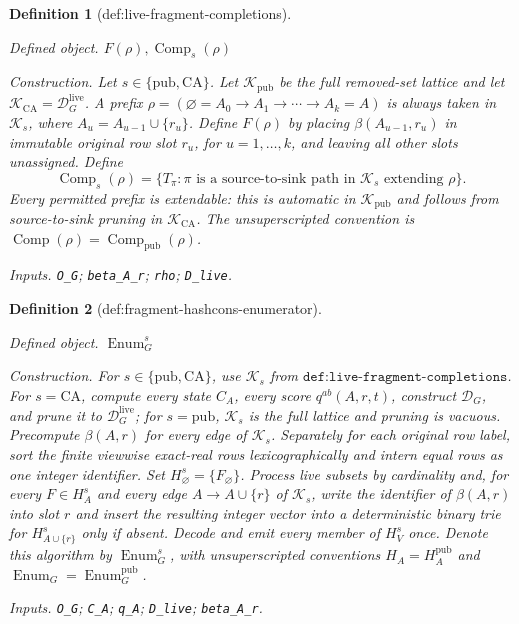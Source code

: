 \documentclass{article}
\newtheorem{definition}{Definition}
\begin{document}
\begin{definition}[def:live-fragment-completions]\label{def:live-fragment-completions}
\par\smallskip\noindent\emph{Defined object.} \(F(\rho),\operatorname{Comp}_s(\rho)\)
\par\smallskip\noindent\emph{Construction.} Let \(s\in\{\mathrm{pub},\mathrm{CA}\}\).  Let \(\mathcal K_{\mathrm{pub}}\) be the full removed-set lattice and let \(\mathcal K_{\mathrm{CA}}=\mathcal D_G^{\mathrm{live}}\).  A prefix \(\rho=(\varnothing=A_0\to A_1\to\cdots\to A_k=A)\) is always taken in \(\mathcal K_s\), where \(A_u=A_{u-1}\cup\{r_u\}\).  Define \(F(\rho)\) by placing \(\beta(A_{u-1},r_u)\) in immutable original row slot \(r_u\), for \(u=1,\ldots,k\), and leaving all other slots unassigned.  Define
\[
 \operatorname{Comp}_s(\rho)=
 \{T_\pi:\pi\text{ is a source-to-sink path in }\mathcal K_s
 \text{ extending }\rho\}.
\]
Every permitted prefix is extendable: this is automatic in \(\mathcal K_{\mathrm{pub}}\) and follows from source-to-sink pruning in \(\mathcal K_{\mathrm{CA}}\).  The unsuperscripted convention is \(\operatorname{Comp}(\rho)=\operatorname{Comp}_{\mathrm{pub}}(\rho)\).
\par\smallskip\noindent\emph{Inputs.} \texttt{O\_\allowbreak{}G}; \texttt{beta\_\allowbreak{}A\_\allowbreak{}r}; \texttt{rho}; \texttt{D\_\allowbreak{}live}.
\end{definition}

\begin{definition}[def:fragment-hashcons-enumerator]\label{def:fragment-hashcons-enumerator}
\par\smallskip\noindent\emph{Defined object.} \(\operatorname{Enum}_G^s\)
\par\smallskip\noindent\emph{Construction.} For \(s\in\{\mathrm{pub},\mathrm{CA}\}\), use \(\mathcal K_s\) from \(\texttt{def:live-fragment-completions}\).  For \(s=\mathrm{CA}\), compute every state \(C_A\), every score \(q^{ab}(A,r,t)\), construct \(\mathcal D_G\), and prune it to \(\mathcal D_G^{\mathrm{live}}\); for \(s=\mathrm{pub}\), \(\mathcal K_s\) is the full lattice and pruning is vacuous.  Precompute \(\beta(A,r)\) for every edge of \(\mathcal K_s\).  Separately for each original row label, sort the finite viewwise exact-real rows lexicographically and intern equal rows as one integer identifier.  Set \(H_{\varnothing}^s=\{F_{\varnothing}\}\).  Process live subsets by cardinality and, for every \(F\in H_A^s\) and every edge \(A\to A\cup\{r\}\) of \(\mathcal K_s\), write the identifier of \(\beta(A,r)\) into slot \(r\) and insert the resulting integer vector into a deterministic binary trie for \(H_{A\cup\{r\}}^s\) only if absent.  Decode and emit every member of \(H_V^s\) once.  Denote this algorithm by \(\operatorname{Enum}_G^s\), with unsuperscripted conventions \(H_A=H_A^{\mathrm{pub}}\) and \(\operatorname{Enum}_G=\operatorname{Enum}_G^{\mathrm{pub}}\).
\par\smallskip\noindent\emph{Inputs.} \texttt{O\_\allowbreak{}G}; \texttt{C\_\allowbreak{}A}; \texttt{q\_\allowbreak{}A}; \texttt{D\_\allowbreak{}live}; \texttt{beta\_\allowbreak{}A\_\allowbreak{}r}.
\end{definition}
\end{document}
